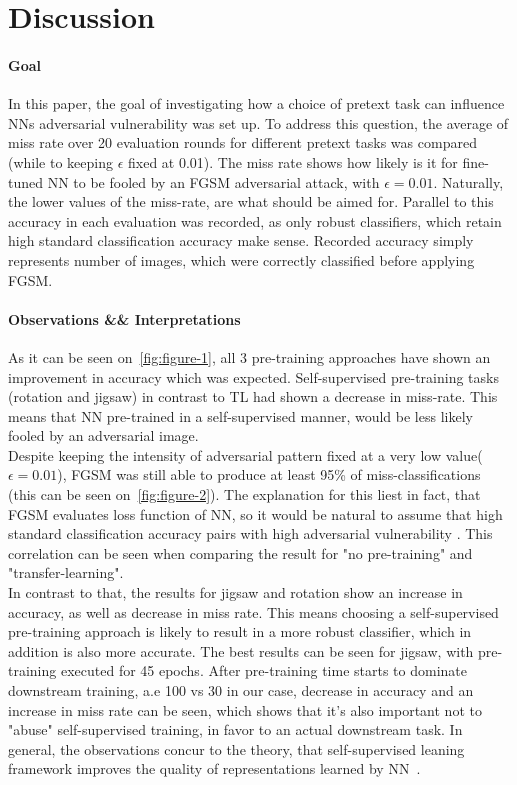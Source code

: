 \section{Discussion}

\paragraph{Goal}In this paper,
the goal of investigating how a choice of pretext task can influence NNs adversarial vulnerability was set up.
To address this question, the average of miss rate over 20 evaluation rounds for different pretext tasks was compared
(while to keeping $\epsilon$ fixed at 0.01).
The miss rate shows how likely is it for fine-tuned NN to be fooled by an FGSM adversarial attack,
with $\epsilon = 0.01$.
Naturally, the lower values of the miss-rate, are what should be aimed for.
Parallel to this accuracy in each evaluation was recorded, as only robust classifiers, which retain high standard
classification accuracy make sense.
Recorded accuracy simply represents number of images, which were correctly classified before applying FGSM.

\paragraph{Observations \&\& Interpretations} As it can be seen on~\ref{fig:figure-1},
all 3 pre-training approaches have shown an improvement in accuracy which was expected.
Self-supervised pre-training tasks (rotation and jigsaw) in contrast to TL had shown a decrease
in miss-rate.
This means that NN pre-trained in a self-supervised manner, would be less likely fooled by an adversarial image.
\\
Despite keeping the intensity of adversarial pattern fixed at a very low value($\epsilon = 0.01$),
FGSM was still able to produce at least 95\% of miss-classifications (this can be seen on~\ref{fig:figure-2}).
The explanation for this liest in fact, that FGSM evaluates loss function of NN,
so it would be natural to assume that high standard classification accuracy pairs with high adversarial vulnerability
\cite{https://doi.org/10.48550/arxiv.1805.12152}.
This correlation can be seen when comparing the result for "no pre-training" and "transfer-learning".
\\
In contrast to that, the results for jigsaw and rotation show an increase in accuracy, as well
as decrease in miss rate.
This means choosing a self-supervised pre-training approach is likely to result in a more robust classifier,
which in addition is also more accurate.
The best results can be seen for jigsaw, with pre-training executed for 45 epochs.
After pre-training time starts to dominate downstream training, a.e 100 vs 30 in our case,
decrease in accuracy and an increase in miss rate can be seen, which shows that it's also important
not to "abuse" self-supervised training, in favor to an actual downstream task.
In general, the observations concur to the theory,
that self-supervised leaning framework improves the quality of representations
learned by NN~\cite{kolesnikov2019revisiting}.


